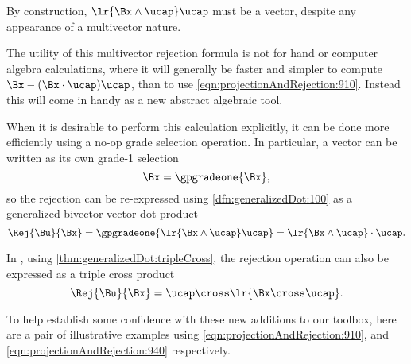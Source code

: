 By construction,
\( \lr{ \Bx \wedge \ucap } \ucap \) must be a vector, despite any appearance of a multivector nature.

The utility of this multivector rejection formula is not for hand or computer algebra calculations, where it will generally be faster and simpler to compute \( \Bx - (\Bx \cdot \ucap) \ucap \), than to use \cref{eqn:projectionAndRejection:910}.
Instead this will come in handy as a new abstract algebraic tool.

When it is desirable to perform this calculation explicitly, it can be done more efficiently using a no-op grade selection operation.
In particular, a vector can be written as its own grade-1 selection
\begin{equation}\label{eqn:projectionAndRejection:920}
\Bx = \gpgradeone{ \Bx },
\end{equation}
so the rejection can be re-expressed
using \cref{dfn:generalizedDot:100}
as a generalized bivector-vector dot product
\begin{equation}\label{eqn:projectionAndRejection:940}
\Rej{\Bu}{\Bx}
= \gpgradeone{ \lr{ \Bx \wedge \ucap } \ucap }
= \lr{ \Bx \wedge \ucap } \cdot \ucap.
\end{equation}

In , using \cref{thm:generalizedDot:tripleCross}, the rejection operation can also be expressed as a triple cross product
\begin{equation}\label{eqn:projectionAndRejection:1140}
\Rej{\Bu}{\Bx}
= \ucap \cross \lr{ \Bx \cross \ucap }.
\end{equation}

To help establish some confidence with these new additions to our toolbox, here are a
pair of illustrative examples using
\cref{eqn:projectionAndRejection:910}, and
\cref{eqn:projectionAndRejection:940} respectively.


